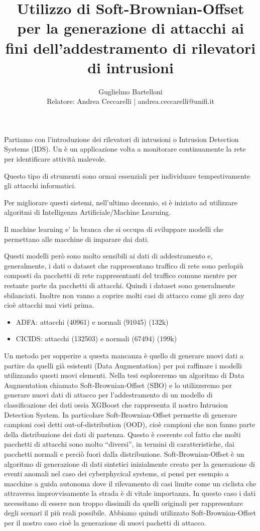 \documentclass[11pt]{article}
\title{Utilizzo di Soft-Brownian-Offset per la generazione di attacchi ai fini dell'addestramento di rilevatori di intrusioni}
\author{Guglielmo Bartelloni\\
Relatore: Andrea Ceccarelli | andrea.ceccarelli@unifi.it}
\date{}
\begin{document}
\thispagestyle{empty}

\maketitle

Partiamo con l'introduzione dei rilevatori di intrusioni o Intrusion Detection Systems (IDS). Un è un applicazione volta a monitorare continuamente la rete per identificare attività malevole. 

Questo tipo di strumenti sono ormai essenziali per individuare tempestivamente gli attacchi informatici.

Per migliorare questi sistemi, nell'ultimo decennio, si è iniziato ad utilizzare algoritmi di Intelligenza Artificiale/Machine Learning.

Il machine learning e' la branca che si occupa di sviluppare modelli che permettano alle macchine di imparare dai dati.

Questi modelli però sono molto sensibili ai dati di addestramento e, generalmente, i dati o dataset che rappresentano traffico di rete sono perlopiù composti da pacchetti di rete rappresentanti del traffico comune mentre per restante parte da pacchetti di attacchi. Quindi i dataset sono generalmente sbilanciati. Inoltre non vanno a coprire molti casi di attacco come gli zero day cioè attacchi mai visti prima.

\begin{itemize}
  \item ADFA: attacchi (40961) e normali (91045) (132k)
  \item CICIDS: attacchi (132503) e normali (67494) (199k)
\end{itemize}

Un metodo per sopperire a questa mancanza è quello di generare nuovi dati a partire da quelli già esistenti (Data Augmentation) per poi raffinare i modelli utilizzando questi nuovi elementi. Nella tesi esploreremo un algoritmo di Data Augmentation chiamato Soft-Brownian-Offset (SBO) e lo utilizzeremo per generare nuovi dati di attacco per l'addestramento di un modello di classificazione dei dati ossia XGBoost che rappresenta il nostro Intrusion Detection System. 
In particolare Soft-Brownian-Offset permette di generare campioni così detti out-of-distribution (OOD), cioè campioni che non fanno parte della distribuzione dei dati di partenza. Questo è coerente col fatto che molti pacchetti di attacchi sono molto ``diversi'', in termini di caratteristiche, dai pacchetti normali e perciò fuori dalla distribuzione.
Soft-Brownian-Offset è un algoritmo di generazione di dati sintetici inizialmente creato per la generazione di eventi anomali nel caso dei cyberphycical systems, si pensi per esempio a macchine a guida autonoma dove il rilevamento di casi limite come un ciclista che attraversa improvvisamente la strada è di vitale importanza.
In questo caso i dati necessitano di essere non troppo dissimili da quelli originali per rappresentare degli scenari il più reali possibile.
Abbiamo quindi utilizzato Soft-Brownian-Offset per il nostro caso cioè la generazione di nuovi pachetti di attacco.
\end{document}
